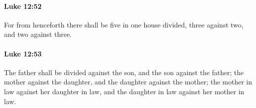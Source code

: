		\paragraph{Luke 12:52} %
			\label{LUKE-12-52}

			For from henceforth there shall be five in one house divided, three against two, and two against three.

			\begin{framed}
			\scriptsize
				\begin{compactdesc}
					\item[SBLG] 
				\end{compactdesc}
			\end{framed}

		\paragraph{Luke 12:53} %
			\label{LUKE-12-53}

			The father shall be divided against the son, and the son against the father; the mother against the daughter, and the daughter against the mother; the mother in law against her daughter in law, and the daughter in law against her mother in law.

